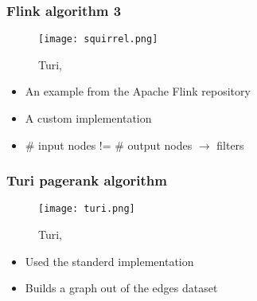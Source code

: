 \begin{frame}
\frametitle{Flink algorithm 3}
\begin{figure}

	\texttt{[image: squirrel.png]}
	\caption{Turi, \cite{turi}}
\end{figure}

\begin{itemize}
\item An example from the Apache Flink repository
\item A custom implementation
\item \# input nodes != \# output nodes $\rightarrow$ filters
\end{itemize}
\end{frame}


\begin{frame}
\frametitle{Turi pagerank algorithm}
\begin{figure}
	\centering
	\texttt{[image: turi.png]}
	\caption{Turi, \cite{turi}}
\end{figure}
\begin{itemize}
\item Used the standerd implementation
\item Builds a graph out of the edges dataset
\end{itemize}


\end{frame}
